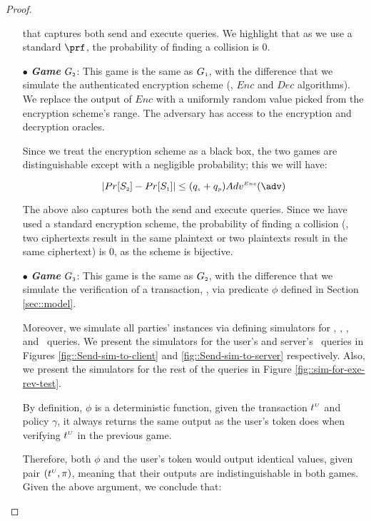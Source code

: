 \begin{proof}
\begin{itemize}
that captures both send and execute queries. We highlight that as we use a standard $\prf$, the probability of finding a collision is $0$. 



\item[$\bullet$] \textit{\textbf{Game}}  $G_{\scriptscriptstyle  2}$: This game is the same as $G_{\scriptscriptstyle  1}$, with the difference that we simulate the authenticated encryption scheme (\ie, $Enc$ and $Dec$ algorithms). We replace the output of $Enc$ with a uniformly random value picked from the encryption scheme's range. The adversary has access to the encryption and decryption oracles. 

Since we treat the encryption scheme as a black box, the two games are distinguishable except with a negligible probability; this we will have: 
 
\begin{equation}\label{eq::game_2}
|Pr[S_{\sss  2}]-Pr[S_{\sss  1}]| \leq (q_{\sss s}+q_{\sss p}) Adv^{\sss Enc}(\adv)
\end{equation}

The above also captures both the send and execute queries. Since we have used a standard encryption scheme, the probability of finding a collision (\eg, two ciphertexts result in the same plaintext or two plaintexts result in the same ciphertext) is $0$, as the scheme is bijective. 



\item[$\bullet$] \textit{\textbf{Game}}  $G_{\scriptscriptstyle  3}$: This game is the same as $G_{\scriptscriptstyle  2}$, with the difference that we simulate the verification of a transaction, \ie, via predicate $\phi$ defined in Section \ref{sec::model}. 

Moreover, we simulate all parties' instances via defining simulators for  \send, \execute, \reveal, and \test\ queries. We present the simulators for the user's and server's \send\ queries in Figures \ref{fig::Send-sim-to-client} and \ref{fig::Send-sim-to-server} respectively. Also, we present the simulators for the rest of the queries in Figure \ref{fig::sim-for-exe-rev-test}. 

By definition,  $\phi$ is a deterministic function, given the transaction $t^{\scriptscriptstyle  U}$ and policy $\gamma$, it always returns the same output as the user's token does when verifying $t^{\scriptscriptstyle  U}$ in the previous game.  

Therefore, both $\phi$ and the user's token would output identical values, given pair $(t^{\scriptscriptstyle  U}, \pi)$, meaning that their outputs are indistinguishable in both games.  Given the above argument, we conclude that:  


\end{itemize}
\end{proof}
